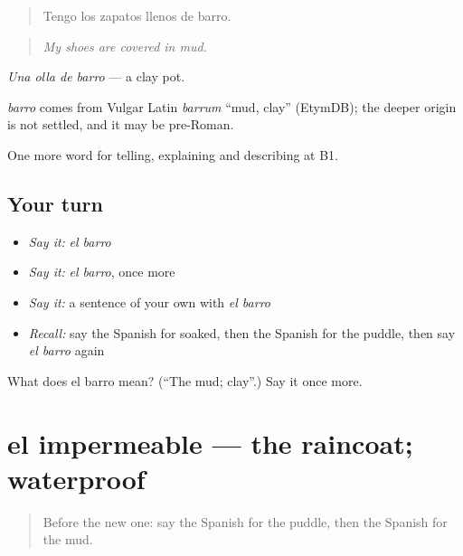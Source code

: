 \begin{quote}
Tengo los zapatos llenos de barro.
\end{quote}

\begin{quote}
\emph{My shoes are covered in mud.}
\end{quote}

\emph{Una olla de barro} — a clay pot.

\begin{cousinweb}
\emph{barro} comes from Vulgar Latin \emph{barrum} \textquotedblleft{}mud, clay\textquotedblright{} (EtymDB); the deeper origin is not settled, and it may be pre-Roman.
\end{cousinweb}

\begin{grammarlens}[title={What you've built}]
One more word for telling, explaining and describing at B1.
\end{grammarlens}

\subsection*{Your turn}
\begin{itemize}
\raggedright
  \item \emph{Say it:} \emph{el barro}
  \item \emph{Say it:} \emph{el barro}, once more
  \item \emph{Say it:} a sentence of your own with \emph{el barro}
  \item \emph{Recall:} say the Spanish for soaked, then the Spanish for the puddle, then say \emph{el barro} again
\end{itemize}

\begin{tcolorbox}[breakable,colback=teal!4,colframe=teal!35!black,title={Before you move on}]
What does el barro mean? (\textquotedblleft{}The mud; clay\textquotedblright{}.) Say it once more.
\end{tcolorbox}
\section[el impermeable]{el impermeable — the raincoat; waterproof}

\label{lesson:ES-C702-impermeable}



\begin{quote}
Before the new one: say the Spanish for the puddle, then the Spanish for the mud.
\end{quote}

